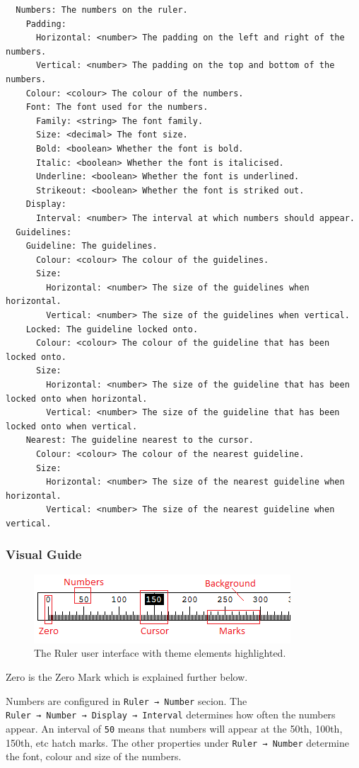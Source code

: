 \documentclass[
]{book}
\begin{document}
\begin{verbatim}
  Numbers: The numbers on the ruler.
    Padding:
      Horizontal: <number> The padding on the left and right of the numbers.
      Vertical: <number> The padding on the top and bottom of the numbers.
    Colour: <colour> The colour of the numbers.
    Font: The font used for the numbers.
      Family: <string> The font family.
      Size: <decimal> The font size.
      Bold: <boolean> Whether the font is bold.
      Italic: <boolean> Whether the font is italicised.
      Underline: <boolean> Whether the font is underlined.
      Strikeout: <boolean> Whether the font is striked out.
    Display:
      Interval: <number> The interval at which numbers should appear.
  Guidelines:
    Guideline: The guidelines.
      Colour: <colour> The colour of the guidelines.
      Size:
        Horizontal: <number> The size of the guidelines when horizontal.
        Vertical: <number> The size of the guidelines when vertical.
    Locked: The guideline locked onto.
      Colour: <colour> The colour of the guideline that has been locked onto.
      Size:
        Horizontal: <number> The size of the guideline that has been locked onto when horizontal.
        Vertical: <number> The size of the guideline that has been locked onto when vertical.
    Nearest: The guideline nearest to the cursor.
      Colour: <colour> The colour of the nearest guideline.
      Size:
        Horizontal: <number> The size of the nearest guideline when horizontal.
        Vertical: <number> The size of the nearest guideline when vertical.
\end{verbatim}

\hypertarget{visual-guide}{%
\subsubsection{Visual Guide}\label{visual-guide}}

\begin{figure}
\centering
\includegraphics{images/ruler-theme.png}
\caption{\label{fig:unnamed-chunk-8}The Ruler user interface with theme elements highlighted.}
\end{figure}

Zero is the Zero Mark which is explained further below.

Numbers are configured in \texttt{Ruler\ →\ Number} secion.
The \texttt{Ruler\ →\ Number\ →\ Display\ →\ Interval} determines how often the numbers appear.
An interval of \texttt{50} means that numbers will appear at the 50th, 100th, 150th, etc hatch marks.
The other properties under \texttt{Ruler\ →\ Number} determine the font, colour and size of the numbers.
\end{document}
